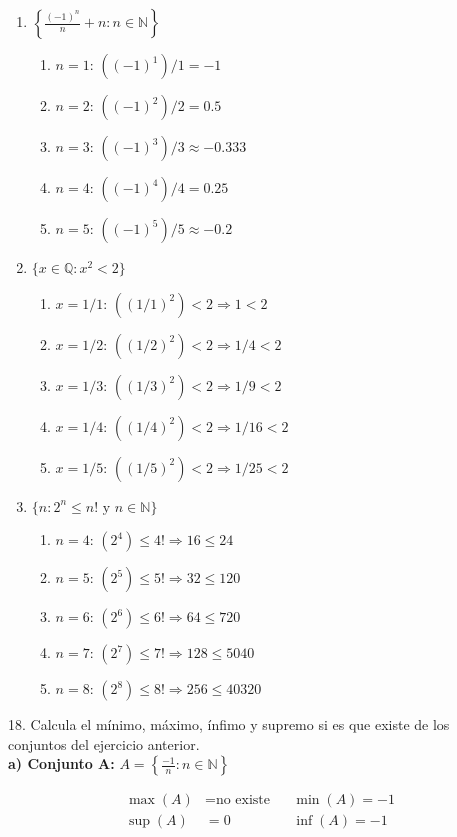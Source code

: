 \documentclass{article}
\begin{document}
\begin{enumerate}
\begin{enumerate}
\end{enumerate}
      \item \(\left\{\frac{(-1)^n}{n}+n : n\in\mathbb{N}\right\}\)
      \begin{enumerate}
\item $n=1$: $((-1)^1)/1 = -1$
\item $n=2$: $((-1)^2)/2 = 0.5$
\item $n=3$: $((-1)^3)/3 \approx -0.333$
\item $n=4$: $((-1)^4)/4 = 0.25$
\item $n=5$: $((-1)^5)/5 \approx -0.2$\\
\end{enumerate}
      \item \(\{x\in\mathbb{Q} : x^2<2\}\)
      \begin{enumerate}
\item $x=1/1$: $((1/1)^2) < 2 \Rightarrow 1 < 2$
\item $x=1/2$: $((1/2)^2) < 2 \Rightarrow 1/4 < 2$
\item $x=1/3$: $((1/3)^2) < 2 \Rightarrow 1/9 < 2$
\item $x=1/4$: $((1/4)^2) < 2 \Rightarrow 1/16 < 2$
\item $x=1/5$: $((1/5)^2) < 2 \Rightarrow 1/25 < 2$\\
\end{enumerate}
      \item \(\{n : 2^n\leq n!\text{ y }n\in\mathbb{N}\}\)
      \begin{enumerate}
\item $n=4$: $(2^4) \leq 4! \Rightarrow 16 \leq 24$
\item $n=5$: $(2^5) \leq 5! \Rightarrow 32 \leq 120$
\item $n=6$: $(2^6) \leq 6! \Rightarrow 64 \leq 720$
\item $n=7$: $(2^7) \leq 7! \Rightarrow 128 \leq 5040$
\item $n=8$: $(2^8) \leq 8! \Rightarrow 256 \leq 40320$\\
\end{enumerate}
    \end{enumerate}

18. Calcula el mínimo, máximo, ínfimo y supremo si es que existe de los conjuntos del ejercicio anterior.\\

\textbf{a) Conjunto A:} $A = \left\{ \frac{-1}{n} : n \in \mathbb{N} \right\}$

\begin{align*}
\max(A) &= \text{no existe} && \min(A) = -1 \\
\sup(A) &= 0 && \inf(A) = -1
\end{align*}
\end{document}
